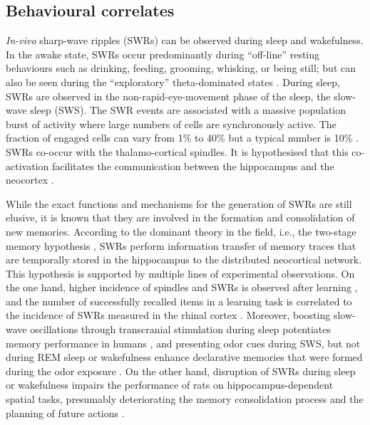   \subsection{Behavioural correlates}
    {\it In-vivo} sharp-wave ripples (SWRs) can be observed during sleep and
    wakefulness. In the awake state, SWRs occur predominantly during ``off-line''
    resting behaviours such as drinking, feeding, grooming, whisking, or being
    still; but can also be seen during the ``exploratory'' theta-dominated states
    \citep{Oneill2006}. During sleep, SWRs are observed in the
    non-rapid-eye-movement phase of the sleep, the slow-wave sleep (SWS). The
    SWR events are associated with a massive population burst of activity
    where large numbers of cells are synchronously active. The fraction of
    engaged cells can vary from 1\% to 40\% but a typical number is 10\%
    \citep{Mizuseki2013}. SWRs co-occur with the thalamo-cortical spindles. It
    is hypothesised that this co-activation facilitates the communication
    between the hippocampus and the neocortex \citep{Sirota2003}.
    
    While the exact functions and mechanisms for the generation of SWRs are
    still elusive, it is known that they are involved in the formation and
    consolidation of new memories. According to the dominant theory in the
    field, i.e., the two-stage memory hypothesis \citep{Buzsaki1989}, SWRs
    perform information transfer of memory traces that are temporally stored in
    the hippocampus to the distributed neocortical network. This hypothesis is
    supported by multiple lines of experimental observations. On the one hand,
    higher incidence of spindles and SWRs is observed after learning
    \citep{Eschenko2006, Eschenko2008, Girardeau2014}, and the number of
    successfully recalled items in a learning task is correlated to the
    incidence of SWRs measured in the rhinal cortex
    \citep{Axmacher2008}. Moreover, boosting slow-wave oscillations through
    transcranial stimulation during sleep potentiates memory performance in
    humans \citep{Marshall2006}, and presenting odor cues during SWS, but not
    during REM sleep or wakefulness enhance declarative memories that were
    formed during the odor exposure \citep{Rasch2007}. On the other hand,
    disruption of SWRs during sleep or wakefulness impairs the performance of
    rats on hippocampus-dependent spatial tasks, presumably deteriorating the
    memory consolidation process \citep{Girardeau2009} and the planning of
    future actions \citep{Jadhav2012}.

